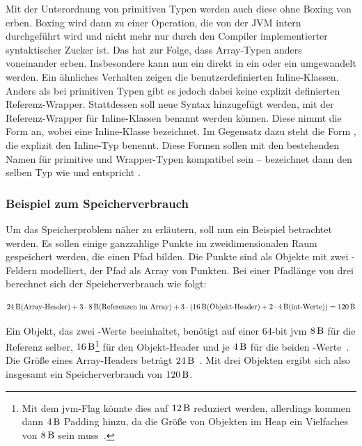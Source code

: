 Mit der Unterordnung von primitiven Typen werden auch diese ohne Boxing von  erben.
Boxing wird dann zu einer Operation, die von der JVM intern durchgeführt wird und nicht mehr nur durch den Compiler implementierter syntaktischer Zucker ist.
Das hat zur Folge, dass Array-Typen anders voneinander erben.
Insbesondere kann nun ein  direkt in ein  oder ein  umgewandelt werden.
Ein ähnliches Verhalten zeigen die benutzerdefinierten Inline-Klassen.
Anders als bei primitiven Typen gibt es jedoch dabei keine explizit definierten Referenz-Wrapper.
Stattdessen soll neue Syntax hinzugefügt werden, mit der Referenz-Wrapper für Inline-Klassen benannt werden können.
Diese nimmt die Form  an, wobei  eine Inline-Klasse bezeichnet.
Im Gegensatz dazu steht die Form , die explizit den Inline-Typ benennt.
Diese Formen sollen mit den bestehenden Namen für primitive und Wrapper-Typen kompatibel sein --  bezeichnet dann den selben Typ wie  und  entspricht .

\subsubsection{Beispiel zum Speicherverbrauch}\label{subsubsec:memory-example}

Um das Speicherproblem näher zu erläutern, soll nun ein Beispiel betrachtet werden.
Es sollen einige ganzzahlige Punkte im zweidimensionalen Raum gespeichert werden, die einen Pfad bilden.
Die Punkte sind als Objekte mit zwei -Feldern modelliert, der Pfad als Array von Punkten.
Bei einer Pfadlänge von drei berechnet sich der Speicherverbrauch wie folgt:

\[ \SI{24}{\byte} \text{(Array-Header)} + 3 \cdot \SI{8}{\byte} \text{(Referenzen im Array)} + 3 \cdot (\SI{16}{\byte} \text{(Objekt-Header)} + 2 \cdot \SI{4}{\byte} \text{(int-Werte)}) = \SI{120}{\byte} \]

Ein Objekt, das zwei -Werte beeinhaltet, benötigt auf einer 64-bit \ac{jvm} $\SI{8}{\byte}$ für die Referenz selber, $\SI{16}{\byte}$\footnote{Mit dem \ac{jvm}-Flag  könnte dies auf $\SI{12}{\byte}$ reduziert werden, allerdings kommen dann $\SI{4}{\byte}$ Padding hinzu, da die Größe von Objekten im Heap ein Vielfaches von $\SI{8}{\byte}$ sein muss~\cite{compressed-oops}.} für den Objekt-Header und je $\SI{4}{\byte}$ für die beiden -Werte~\cite{compressed-oops}.
Die Größe eines Array-Headers beträgt $\SI{24}{\byte}$~\cite{compressed-oops}.
Mit drei Objekten ergibt sich also insgesamt ein Speicherverbrauch von $\SI{120}{\byte}$.

